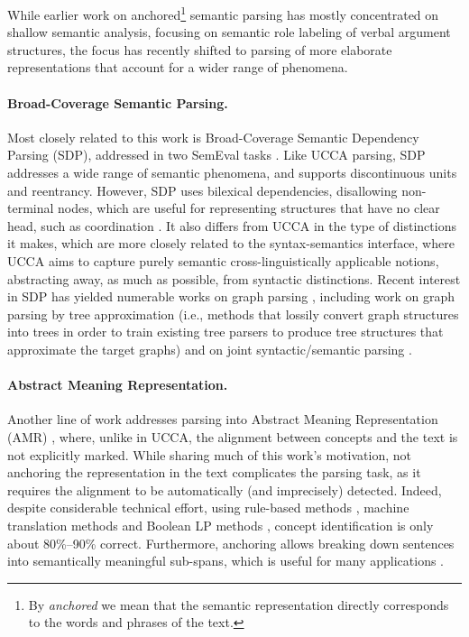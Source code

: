 \documentclass[11pt,a4paper]{article}
\newcommand{\secref}[1]{Section~\ref{#1}}
\begin{document}
While earlier work on anchored\footnote{By {\it anchored} we mean that the semantic representation
directly corresponds to the words and phrases of the text.}
semantic parsing has mostly concentrated on shallow semantic analysis,
focusing on semantic role labeling of verbal argument structures,
the focus has recently shifted to parsing of more elaborate representations that account
for a wider range of phenomena.

\paragraph{Broad-Coverage Semantic Parsing.}
Most closely related to this work is Broad-Coverage Semantic Dependency Parsing (SDP),
addressed in two SemEval tasks \cite{oepen2014semeval,oepen2015semeval}.
Like UCCA parsing, SDP addresses a wide range of semantic phenomena,
and supports discontinuous units and reentrancy.
However, SDP uses bilexical dependencies, disallowing non-terminal nodes, which
are useful for representing structures that have no clear head, such as coordination
\cite[see \secref{sec:introduction}]{Ivanova2012who}. It also differs from UCCA in the type
of distinctions it makes, which are more closely related to the syntax-semantics interface,
where UCCA aims to capture purely semantic cross-linguistically applicable notions, abstracting
away, as much as possible, from syntactic distinctions.
Recent interest in SDP has yielded numerable works on graph parsing
\cite{ribeyre-villemontedelaclergerie-seddah:2014:SemEval,thomson-EtAl:2014:SemEval,almeida-martins:2015:SemEval,du-EtAl:2015:SemEval}, including work on graph parsing
by tree approximation (i.e., methods that lossily convert graph structures
into trees in order to train existing tree parsers to produce tree structures
that approximate the target graphs) \cite{agic-koller:2014:SemEval,schluter-EtAl:2014:SemEval}
and on joint syntactic/semantic parsing
\cite{henderson2013multilingual,swayamdipta-EtAl:2016:CoNLL}.

\paragraph{Abstract Meaning Representation.}
Another line of work addresses parsing into Abstract Meaning Representation (AMR)
\cite{flanigan2014discriminative,vanderwende2015amr,pust2015parsing,artzi2015broad},
where, unlike in UCCA, the alignment between concepts and the text is not explicitly marked.
While sharing much of this work's motivation, not anchoring the representation in the text
complicates the parsing task, as it requires
the alignment to be automatically (and imprecisely) detected.
Indeed, despite considerable technical effort,
using rule-based methods \cite{flanigan2014discriminative}, machine
translation methods \cite{pourdamghani2014aligning} and Boolean LP methods
\cite{werling2015robust}, concept identification is only about 80\%--90\% correct.
Furthermore, anchoring allows breaking down sentences into semantically meaningful sub-spans,
which is useful for many applications \cite{fernandez2015parsing,birch2016hume}.
\end{document}
